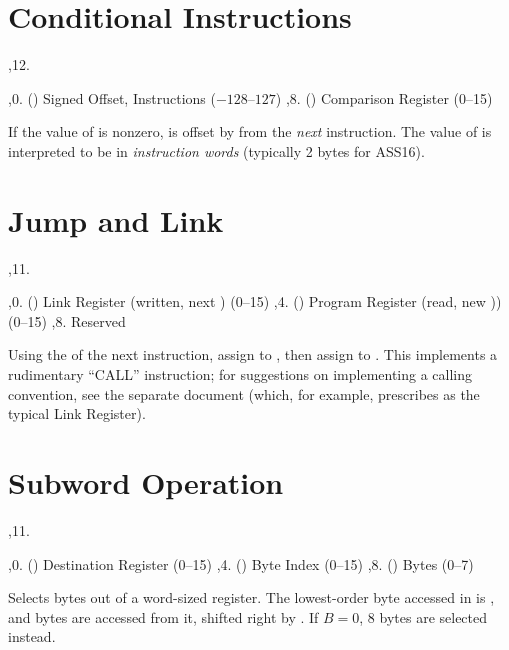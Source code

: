 \bigskip
{
	\tabskip=3pt
}
\bigskip

\section{Conditional Instructions}

\noindent\ins{},12. 

\li \ins{},0. () Signed Offset, Instructions ($-128$--$127$)
\li \ins{},8. () Comparison Register (0--15)

If the value of  is nonzero,  is offset by  from the
{\it next} instruction. The value of  is interpreted to be in {\it
instruction words} (typically 2 bytes for ASS16).

\section{Jump and Link}

\noindent\ins{},11. 

\li \ins{},0. () Link Register (written, next ) (0--15)
\li \ins{},4. () Program Register (read, new )) (0--15)
\li \ins{},8. Reserved

Using the  of the next instruction, assign  to , then
assign  to . This implements a rudimentary ``CALL'' instruction;
for suggestions on implementing a calling convention, see the separate
document (which, for example, prescribes  as the typical Link
Register).

\section{Subword Operation}

\noindent\ins{},11. 

\li \ins{},0. () Destination Register (0--15)
\li \ins{},4. () Byte Index (0--15)
\li \ins{},8. () Bytes (0--7)

Selects bytes out of a word-sized register. The lowest-order byte accessed in
 is , and  bytes are accessed from it, shifted right by
. If $B = 0$, 8 bytes are selected instead.

